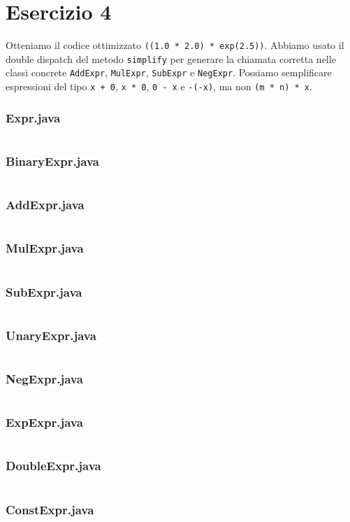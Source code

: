 \section*{Esercizio 4}

Otteniamo il codice ottimizzato \texttt{((1.0 * 2.0) * exp(2.5))}.  Abbiamo
usato il double dispatch del metodo \texttt{simplify} per generare la
chiamata corretta nelle classi concrete \texttt{AddExpr}, \texttt{MulExpr},
\texttt{SubExpr} e \texttt{NegExpr}. Possiamo semplificare espressioni del tipo
\texttt{x + 0}, \texttt{x * 0}, \texttt{0 - x} e \texttt{-(-x)}, ma non
\texttt{(m * n) * x}.

\subsubsection*{Expr.java}
\inputminted{java}{tex/src/4/Expr.java}

\subsubsection*{BinaryExpr.java}
\inputminted{java}{tex/src/4/BinaryExpr.java}

\subsubsection*{AddExpr.java}
\inputminted{java}{tex/src/4/AddExpr.java}

\subsubsection*{MulExpr.java}
\inputminted{java}{tex/src/4/MulExpr.java}

\subsubsection*{SubExpr.java}
\inputminted{java}{tex/src/4/SubExpr.java}

\subsubsection*{UnaryExpr.java}
\inputminted{java}{tex/src/4/UnaryExpr.java}

\subsubsection*{NegExpr.java}
\inputminted{java}{tex/src/4/NegExpr.java}

\subsubsection*{ExpExpr.java}
\inputminted{java}{tex/src/4/ExpExpr.java}

\subsubsection*{DoubleExpr.java}
\inputminted{java}{tex/src/4/DoubleExpr.java}

\subsubsection*{ConstExpr.java}
\inputminted{java}{tex/src/4/ConstExpr.java}

